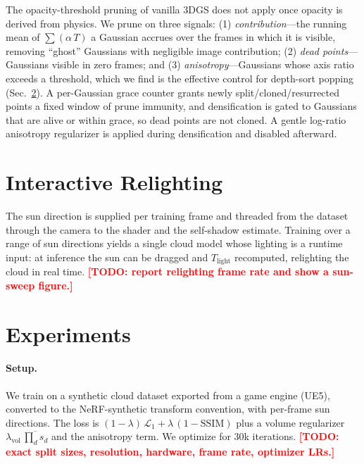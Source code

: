 \documentclass[sigconf]{acmart}
\newcommand{\Tlight}{T_{\mathrm{light}}}
\newcommand{\todo}[1]{\textcolor{red}{\textbf{[TODO: #1]}}}
\begin{document}
The opacity-threshold pruning of vanilla 3DGS does not apply once opacity is
derived from physics. We prune on three signals: (1) \emph{contribution}---the
running mean of $\sum(\alpha\,T)$ a Gaussian accrues over the frames in which it
is visible, removing ``ghost'' Gaussians with negligible image contribution;
(2) \emph{dead points}---Gaussians visible in zero frames; and (3)
\emph{anisotropy}---Gaussians whose axis ratio exceeds a threshold, which we
find is the effective control for depth-sort popping (Sec.~\ref{sec:results}).
A per-Gaussian grace counter grants newly split/cloned/resurrected points a
fixed window of prune immunity, and densification is gated to Gaussians that are
alive or within grace, so dead points are not cloned. A gentle log-ratio
anisotropy regularizer is applied during densification and disabled afterward.

\section{Interactive Relighting}
\label{sec:relight}

The sun direction is supplied per training frame and threaded from the dataset
through the camera to the shader and the self-shadow estimate. Training over a
range of sun directions yields a single cloud model whose lighting is a runtime
input: at inference the sun can be dragged and $\Tlight$ recomputed, relighting
the cloud in real time. \todo{report relighting frame rate and show a sun-sweep
figure.}

\section{Experiments}
\label{sec:results}

\paragraph{Setup.}
We train on a synthetic cloud dataset exported from a game engine (UE5),
converted to the NeRF-synthetic transform convention, with per-frame sun
directions. The loss is $(1-\lambda)\,\mathcal{L}_1 + \lambda\,(1-\text{SSIM})$
plus a volume regularizer $\lambda_{\text{vol}}\,\overline{\prod_d s_d}$ and the
anisotropy term. We optimize for 30k iterations. \todo{exact split sizes,
resolution, hardware, frame rate, optimizer LRs.}
\end{document}
